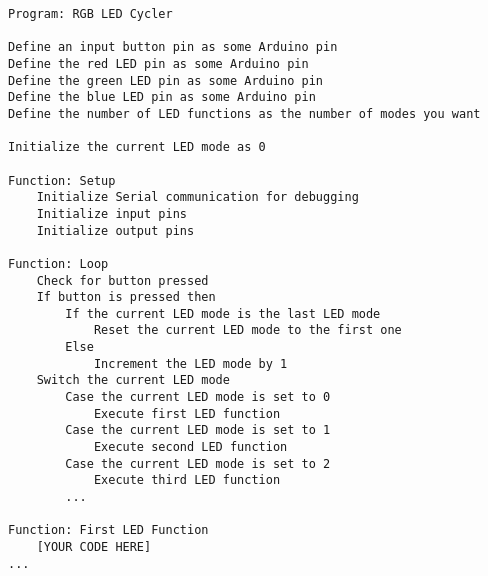 \begin{lstlisting}[style=kaolstplain, linewidth=1.5\textwidth]
Program: RGB LED Cycler

Define an input button pin as some Arduino pin
Define the red LED pin as some Arduino pin
Define the green LED pin as some Arduino pin
Define the blue LED pin as some Arduino pin
Define the number of LED functions as the number of modes you want

Initialize the current LED mode as 0

Function: Setup
    Initialize Serial communication for debugging
    Initialize input pins
    Initialize output pins

Function: Loop
    Check for button pressed
    If button is pressed then
        If the current LED mode is the last LED mode
            Reset the current LED mode to the first one
        Else
            Increment the LED mode by 1
    Switch the current LED mode
        Case the current LED mode is set to 0
            Execute first LED function
        Case the current LED mode is set to 1
            Execute second LED function
        Case the current LED mode is set to 2
            Execute third LED function
        ...

Function: First LED Function
    [YOUR CODE HERE]
...

\end{lstlisting}
